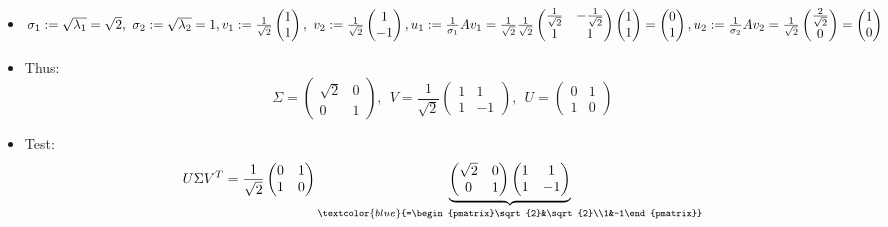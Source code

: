 {\begin{enumerate}
\begin{itemize}
\begin{enumerate}
\begin{align*}
			&\Leftrightarrow~~\tilde{v}_2=\begin{pmatrix}1\\-1\end{pmatrix}
			\end{align*}
		\end{enumerate}
		\item $\sigma_1:=\sqrt{\lambda_1}=\sqrt{2},~\sigma_2:=\sqrt{\lambda_2}=1,\\
		v_1:=\frac{1}{\sqrt{2}}\begin{pmatrix}1\\1\end{pmatrix},~v_2:=\frac{1}{\sqrt{2}}\begin{pmatrix}1\\-1\end{pmatrix},\\
		u_1:=\frac{1}{\sigma_1}Av_1=\frac{1}{\sqrt{2}}\frac{1}{\sqrt{2}}
		\begin{pmatrix}
		\frac{1}{\sqrt{2}}&-\frac{1}{\sqrt{2}}\\
		1&1
		\end{pmatrix}\begin{pmatrix}1\\1\end{pmatrix}=\begin{pmatrix}0\\1\end{pmatrix},\\
		u_2:=\frac{1}{\sigma_2}Av_2=\frac{1}{\sqrt{2}}\begin{pmatrix}\frac{2}{\sqrt{2}}\\0\end{pmatrix}=\begin{pmatrix}1\\0\end{pmatrix}$
		\item 
		Thus:
		$$
		\Sigma =\begin{pmatrix}\sqrt{2}&0\\0&1\end{pmatrix},~~
		V=\frac{1}{\sqrt{2}}\begin{pmatrix}1&1\\1&-1\end{pmatrix},~~
		U=\begin{pmatrix}0&1\\1&0\end{pmatrix}
		$$
		\item 
		Test:
		$$
		U\Sigma V^T
		=\frac{1}{\sqrt{2}}\begin{pmatrix}0&1\\1&0\end{pmatrix}\underbrace{\begin{pmatrix}\sqrt{2}&0\\0&1\end{pmatrix}\begin{pmatrix}1&1\\1&-1\end{pmatrix}}_{\textcolor{blue}{=\begin{pmatrix}\sqrt{2}&\sqrt{2}\\1&-1\end{pmatrix}}}
$$
\end{itemize}
\end{enumerate}}
